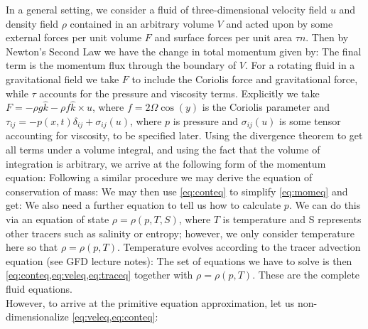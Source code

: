 \iffalse
In a general setting, we consider a fluid of three-dimensional velocity field $u$ and density field $\rho$ contained in an arbitrary volume $V$ and acted upon by some external forces per unit volume $F$ and surface forces per unit area $\tau n$.  Then by Newton's Second Law we have the change in total momentum given by:
The final term is the momentum flux through the boundary of $V$. For a rotating fluid in a gravitational field we take $F$ to include the Coriolis force and gravitational force, while $\tau$ accounts for the pressure and viscosity terms.  Explicitly we take $F = -\rho g \hat{k} -\rho f \hat{k}\times u$, where $f = 2\Omega\cos(y)$ is the Coriolis parameter and $\tau_{ij} = -p(x,t)\delta_{ij} + \sigma_{ij}(u)$, where $p$ is pressure and $\sigma_{ij}(u)$ is some tensor accounting for viscosity, to be specified later. Using the divergence theorem to get all terms under a volume integral, and using the fact that the volume of integration is arbitrary, we arrive at the following form of the momentum equation:
Following a similar procedure we may derive the equation of conservation of mass:
We may then use \cref{eq:conteq} to simplify \cref{eq:momeq} and get:
We also need a further equation to tell us how to calculate $p$. We can do this via an equation of state $\rho = \rho (p, T, S)$, where $T$ is temperature and S represents other tracers such as salinity or entropy; however, we only consider temperature here so that $\rho = \rho(p,T)$. Temperature evolves according to the tracer advection equation (see GFD lecture notes):
The set of equations we have to solve is then \cref{eq:conteq,eq:veleq,eq:traceq} together with $\rho = \rho(p,T)$. These are the complete fluid equations. \\
\linebreak
However, to arrive at the primitive equation approximation, let us non-dimensionalize \cref{eq:veleq,eq:conteq}:
